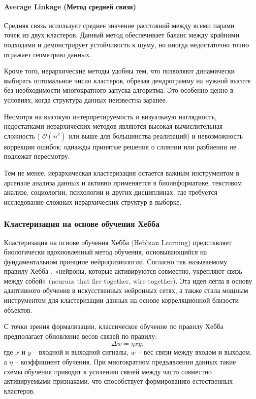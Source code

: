         \paragraph{Average Linkage (Метод средней связи)}
            Средняя связь \cite{Finkelman2021averagelinkage} использует среднее значение расстояний между всеми парами точек из двух кластеров. Данный метод обеспечивает баланс между крайними подходами и демонстрирует устойчивость к шуму, но иногда недостаточно точно отражает геометрию данных.

        Кроме того, иерархические методы удобны тем, что позволяют динамически выбирать оптимальное число кластеров, обрезая дендрограмму на нужной высоте без необходимости многократного запуска алгоритма. Это особенно ценно в условиях, когда структура данных неизвестна заранее.

        Несмотря на высокую интерпретируемость и визуальную наглядность, недостатками иерархических методов являются высокая вычислительная сложность ( \(\mathcal{O}(n^2)\) или выше для большинства реализаций) и невозможность коррекции ошибок: однажды принятые решения о слиянии или разбиении не подлежат пересмотру.

        Тем не менее, иерархическая кластеризация остается важным инструментом в арсенале анализа данных и активно применяется в биоинформатике, текстовом анализе, социологии, психологии и других дисциплинах, где требуется исследование сложных иерархических структур в выборке.

    \subsubsection{Кластеризация на основе обучения Хебба}
        Кластеризация на основе обучения Хебба (Hebbian Learning) представляет биологически вдохновленный метод обучения, основывающийся на фундаментальном принципе нейрофизиологии. Согласно так называемому правилу Хебба \cite{Hebb1949}, «нейроны, которые активируются совместно, укрепляют связь между собой» (neurons that fire together, wire together). Эта идея легла в основу адаптивного обучения в искусственных нейронных сетях, а также стала мощным инструментом для кластеризации данных на основе корреляционной близости объектов.

        С точки зрения формализации, классическое обучение по правилу Хебба предполагает обновление весов связей по правилу:
        \begin{equation}
            \Delta w = \eta x y,
        \end{equation}
        где \(x\) и \(y\) -- входной и выходной сигналы, \(w\) -- вес связи между входом и выходом, а \(\eta\) -- коэффициент обучения. При многократном предъявлении данных такие схемы обучения приводят к усилению связей между часто совместно активируемыми признаками, что способствует формированию естественных кластеров.


